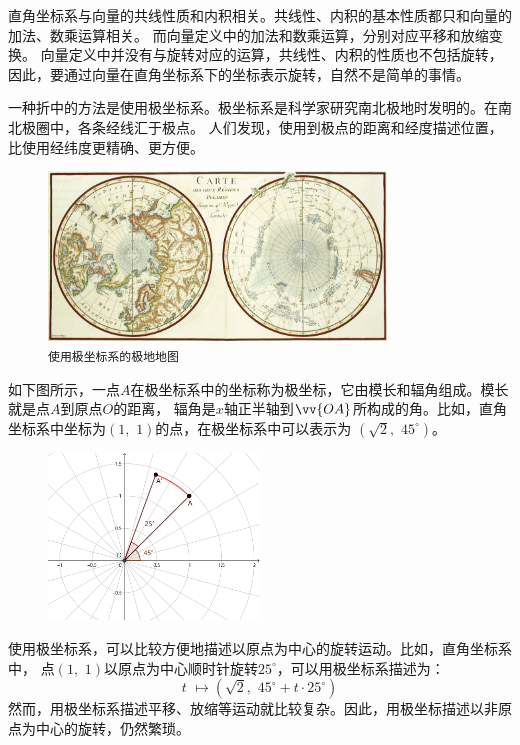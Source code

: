 \documentclass[12pt,UTF8]{ctexbook}
\begin{document}
直角坐标系与向量的共线性质和内积相关。共线性、内积的基本性质都只和向量的加法、数乘运算相关。
而向量定义中的加法和数乘运算，分别对应平移和放缩变换。
向量定义中并没有与旋转对应的运算，共线性、内积的性质也不包括旋转，
因此，要通过向量在直角坐标系下的坐标表示旋转，自然不是简单的事情。

一种折中的方法是使用极坐标系。极坐标系是科学家研究南北极地时发明的。在南北极圈中，各条经线汇于极点。
人们发现，使用到极点的距离和经度描述位置，比使用经纬度更精确、更方便。

\begin{figure}[h] %
    \centering
    \includegraphics[width=0.8\textwidth]{极坐标例1南北极地图2.jpg}
    \caption*{\texttt{使用极坐标系的极地地图}}
\end{figure}
如下图所示，一点$A$在极坐标系中的坐标称为极坐标，它由模长和辐角组成。模长就是点$A$到原点$O$的距离，
辐角是$x$轴正半轴到$\vv{OA}$所构成的角。比如，直角坐标系中坐标为$(1,\,\,1)$的点，在极坐标系中可以表示为
$(\sqrt{2},\,\, 45^\circ)$。

\begin{figure}[h] %
    \vspace{4pt}
    \centering
    \includegraphics[width=0.5\textwidth]{极坐标例2.png}
\end{figure}

使用极坐标系，可以比较方便地描述以原点为中心的旋转运动。比如，直角坐标系中，
点$(1,\,\,1)$以原点为中心顺时针旋转$25^\circ$，可以用极坐标系描述为：
$$ t\,\, \mapsto (\sqrt{2}, \,\, 45^\circ + t \cdot 25^\circ)$$
然而，用极坐标系描述平移、放缩等运动就比较复杂。因此，用极坐标描述以非原点为中心的旋转，仍然繁琐。
\end{document}
